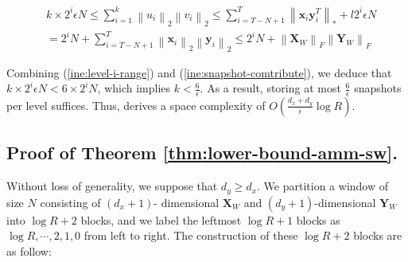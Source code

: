     \begin{align}
      &  k\times2^i\epsilon N  \leq \sum_{i=1}^k\left\|u_i \right\|_2\left\|v_i\right\|_2  \leq \sum_{i=T-N+1}^T \left\| \boldsymbol{x}_i \boldsymbol{y}_i^T\right\|_* + l2^i\epsilon N  \nonumber \\
        & = 2^iN + \sum_{i=T-N+1}^T \left\| \boldsymbol{x}_i\right\|_2 \left\| \boldsymbol{y}_i\right\|_2  \leq 2^iN + \left\| \boldsymbol{X}_W\right\|_F \left\| \boldsymbol{Y}_W\right\|_F \label{ine:snapshot-comtribute}
    \end{align}
    
    Combining (\ref{ine:level-i-range}) and (\ref{ine:snapshot-comtribute}), we deduce that $k\times2^i\epsilon N < 6\times 2^iN$, which implies $k<\frac{6}{\epsilon}$. As a result, storing at most $\frac{6}{\epsilon}$ snapshots per level suffices. Thus, \newsolution derives a space complexity of $O(\frac{d_x+d_y}{\epsilon}\log{R})$.
    


\subsection{Proof of Theorem \ref{thm:lower-bound-amm-sw}.} Without loss of generality, we suppose that $d_y\geq d_x$. We partition a window of size $N$ consisting of $(d_x+1)$-
dimensional $\boldsymbol{X}_W$ and $(d_y+1)$-dimensional $\boldsymbol{Y}_W$ into $\log{R}+ 2$ blocks, and we label the leftmost $\log{R}+1$ blocks as $\log{R},\cdots,2,1,0$ from left to right. The construction of these $\log{R}+2$ blocks are as follow: 

